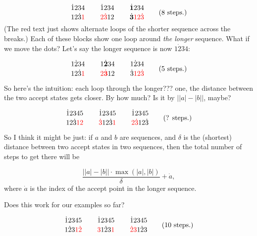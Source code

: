 \documentclass{article}
\begin{document}
\[
  \SeqCompare{\dot{1}234}{12\dot{3}\textcolor{red}{1}} \qquad
  \SeqCompare{\dot{1}234}{\textcolor{red}{2\dot{3}}12} \qquad
  \SeqCompare{\dot{\mathbf{1}}234}{\dot{\mathbf{3}}\textcolor{red}{12\dot{3}}} \qquad
  \text{(8 steps.)}
\]
(The red text just shows alternate loops of the shorter sequence across the
breaks.) Each of these blocks show one loop around \emph{the longer} sequence. What if we move the dots? Let's say the longer sequence is now $1\dot{2}34$:

\[
  \SeqCompare{1\dot{2}34}{12\dot{3}\textcolor{red}{1}} \qquad
  \SeqCompare{1\dot{\mathbf{2}}34}{\textcolor{red}{2\dot{\mathbf{3}}}12} \qquad
  \SeqCompare{1\dot{2}34}{\dot{3}\textcolor{red}{12\dot{3}}} \qquad
  \text{(5 steps.)}
\]


So here's the intuition: each loop through the longer??? one, the distance between the two accept states gets closer. By how much? Is it by $\big| |a| - |b| \big|$, maybe?


\[
  \SeqCompare{\dot{1}2345}{12\dot{3}\textcolor{red}{12}} \qquad
  \SeqCompare{\dot{1}2345}{\textcolor{red}{\dot{3}}12\dot{3}\textcolor{red}{1}} \qquad
  \SeqCompare{\dot{1}2345}{\textcolor{red}{2\dot{3}}12\dot{3}} \qquad
  \text{(? steps.)}
\]

So I think it might be just: if $a$ and $b$ are sequences, and
$\delta$ is the (shortest) distance between two accept states in two sequences,
then the total number of steps to get there will be

\[
  \frac{\big| |a| - |b| \big| \cdot \max(|a|, |b|)}{\delta} + \dot{a},
\]
where $\dot{a}$ is the index of the accept point in the longer sequence.

Does this work for our examples so far?

\[
  \SeqCompare{\dot{1}2345}
    {1\dot{2}3\textcolor{red}{1\dot{2}}} \qquad
  \SeqCompare{\dot{1}2345}
    {\textcolor{red}{3}1\dot{2}3\textcolor{red}{1}} \qquad
  \SeqCompare{\dot{1}2345}
    {\textcolor{red}{\dot{2}3}1\dot{2}3} \qquad
  \text{(10 steps.)}
\]

\NewDocumentCommand{}
\end{document}
